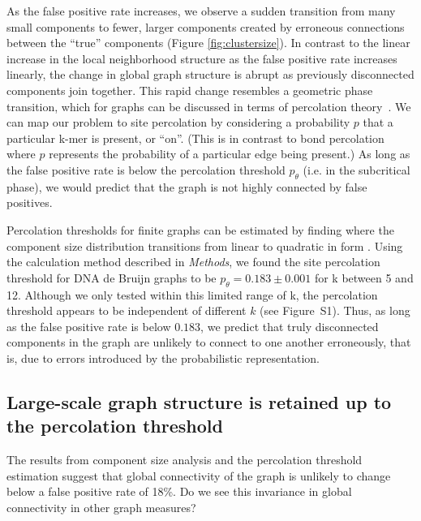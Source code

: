 \documentclass{pnastwo}
\begin{document}
\begin{article}
As the false positive rate increases, we observe a sudden transition
from many small components to fewer, larger components created by erroneous connections between the ``true'' components (Figure \ref{fig:clustersize}).  In contrast to the linear increase in the
local neighborhood structure as the false positive rate increases
linearly, the change in global graph structure is abrupt as previously
disconnected components join together.  This rapid change resembles a
geometric phase transition, which for graphs can be discussed in terms of
percolation theory~\cite{staufferintro}. We can map our problem to site percolation by
considering a probability $p$ that a particular k-mer is present, or ``on''. (This is in contrast to bond percolation where $p$ represents
the probability of a particular edge being present.) As
long as the false positive rate is below the percolation threshold
$p_\theta$ (i.e. in the subcritical phase), we would predict that the graph
is not highly connected by false positives.


Percolation thresholds for finite graphs can be estimated by finding
where the component size distribution transitions from linear to
quadratic in form \cite{stauffer1979scaling}.  Using the calculation
method described in \emph{Methods}, we found the site percolation
threshold for DNA de Bruijn graphs to be $p_\theta = 0.183 \pm 0.001$
for k between 5 and 12.
Although we only tested within this limited range of k, the
percolation threshold appears to be independent of different $k$ (see
Figure~S1).
Thus, as long as the false positive rate is below $0.183$, we
predict that truly disconnected components in the graph are unlikely
to connect to one another erroneously, that is, due to errors
introduced by the probabilistic representation.

\subsection{Large-scale graph structure is retained up to the percolation threshold}

The results from component size analysis and the percolation threshold
estimation suggest that global connectivity of the graph is unlikely
to change below a false positive rate of 18\%.  Do we see this invariance
in global connectivity in other graph measures?


\end{article}
\end{document}
